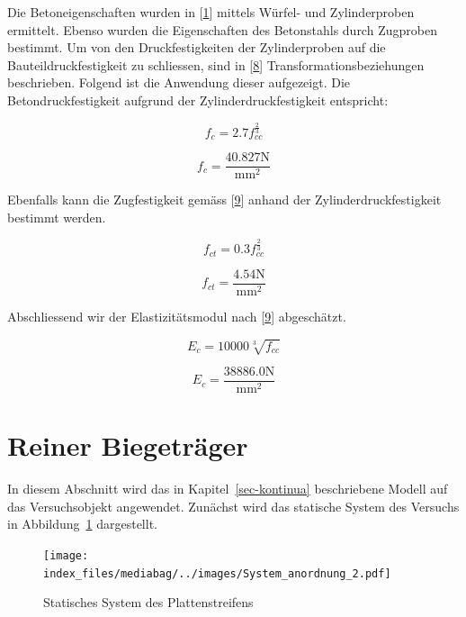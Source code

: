 \documentclass[
  12pt,
  letterpaper,
  egregdoesnotlikesansseriftitles]{scrreprt}
\begin{document}
Die Betoneigenschaften wurden in
{[}\protect\hyperlink{ref-Jaeger2006}{1}{]} mittels Würfel- und
Zylinderproben ermittelt. Ebenso wurden die Eigenschaften des
Betonstahls durch Zugproben bestimmt. Um von den Druckfestigkeiten der
Zylinderproben auf die Bauteildruckfestigkeit zu schliessen, sind in
{[}\protect\hyperlink{ref-Jaeger2014}{8}{]} Transformationsbeziehungen
beschrieben. Folgend ist die Anwendung dieser aufgezeigt. Die
Betondruckfestigkeit aufgrund der Zylinderdruckfestigkeit entspricht:

\begin{equation}f_{c} = 2.7 f_{cc}^{\frac{2}{3}}\end{equation}

\begin{equation}f_{c} = \frac{40.827 \text{N}}{\text{mm}^{2}}\end{equation}

Ebenfalls kann die Zugfestigkeit gemäss
{[}\protect\hyperlink{ref-Jaeger2013}{9}{]} anhand der
Zylinderdruckfestigkeit bestimmt werden.

\begin{equation}f_{ct} = 0.3 f_{cc}^{\frac{2}{3}}\end{equation}

\begin{equation}f_{ct} = \frac{4.54 \text{N}}{\text{mm}^{2}}\end{equation}

Abschliessend wir der Elastizitätsmodul nach
{[}\protect\hyperlink{ref-Jaeger2013}{9}{]} abgeschätzt.

\begin{equation}E_{c} = 10000 \sqrt[3]{f_{cc}}\end{equation}

\begin{equation}E_{c} = \frac{38886.0 \text{N}}{\text{mm}^{2}}\end{equation}

\hypertarget{reiner-biegetruxe4ger}{%
\section{Reiner Biegeträger}\label{reiner-biegetruxe4ger}}

In diesem Abschnitt wird das in Kapitel~\ref{sec-kontinua} beschriebene
Modell auf das Versuchsobjekt angewendet. Zunächst wird das statische
System des Versuchs in Abbildung~\ref{fig-system_2} dargestellt.

\begin{figure}[H]

{\centering \texttt{[image: index\_files/mediabag/../images/System\_anordnung\_2.pdf]}

}

\caption{\label{fig-system_2}Statisches System des Plattenstreifens}

\end{figure}
\end{document}
